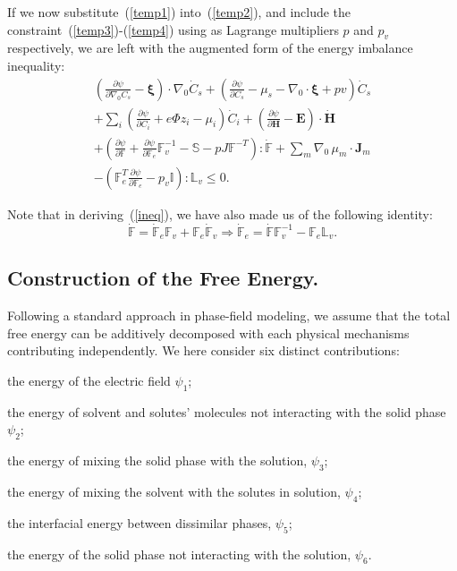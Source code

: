 \documentclass[runningheads]{llncs}
\newcommand{\indentitem}{\setlength\itemindent{20pt}}
\newcommand{\F}{\ensuremath{\mathbb{F}}}
\newcommand{\LL}{\ensuremath{\mathbb{L}}}
\begin{document}
If we now substitute~(\ref{temp1}) into~(\ref{temp2}), and include the constraint~(\ref{temp3})-(\ref{temp4}) using as Lagrange multipliers $p$ and $p_v$ respectively, we are left with the augmented form of the energy imbalance inequality:
\begin{equation}
\begin{aligned}
\left(\frac{\partial \psi}{\partial \nabla_0 C_s}-\boldsymbol{\xi}\right) \cdot \nabla_0 \dot{C}_s + \left(\frac{\partial \psi}{\partial C_s}-\mu_s-\nabla_0 \cdot \boldsymbol{\xi}+p v\right)\dot{C}_s\\
+ \sum_i\left(\frac{\partial \psi}{\partial C_i} + e\Phi z_i-\mu_i\right) \dot{C}_i +\left(\frac{\partial \psi}{\partial \mathbf{H}}-\mathbf{E}\right) \cdot \dot{\mathbf{H}}\\
+ \left(\frac{\partial \psi}{\partial \F} + \frac{\partial \psi}{\partial\F_e}\F_v^{-1}- \mathbb{S} - p J \F^{-T}\right): \dot{\F}+ \sum_m \nabla_0 \,\mu_m \cdot \mathbf{J}_m \\
- \left(\F_e^T\frac{\partial \psi}{\partial \F_e}-p_v\mathbb{I}\right):\mathbb{L}_v\leq 0 . \label{ineq}
\end{aligned}
\end{equation}

Note that in deriving~(\ref{ineq}), we have also made us of the following identity:
\begin{equation}
\dot{\F}=\dot{\F}_e\F_v+\F_e\dot{\F}_v \Longrightarrow \dot{\F}_e=\dot{\F}\F_v^{-1}-\F_e \LL_v.
\end{equation}

\subsection{Construction of the Free Energy.}

Following a standard approach in phase-field modeling, we assume that the total free energy can be additively decomposed with each physical mechanisms contributing independently. We here consider six distinct contributions:

\begin{enumerate}
	{\indentitem\item[\textbullet] the energy of the electric field $\psi_1$;}
	{\indentitem \item[\textbullet] the energy of solvent and solutes' molecules not interacting with the solid phase $\psi_2$;}
	{\indentitem\item[\textbullet] the energy of mixing the solid phase with the solution, $\psi_3$;}
	{\indentitem\item[\textbullet] the energy of mixing the solvent with the solutes in solution, $\psi_4$;}
	{\indentitem\item[\textbullet] the interfacial energy between dissimilar phases, $\psi_5$;}
	{\indentitem\item[\textbullet] the energy of the solid phase not interacting with the solution, $\psi_6$.}
\end{enumerate}
\end{document}
